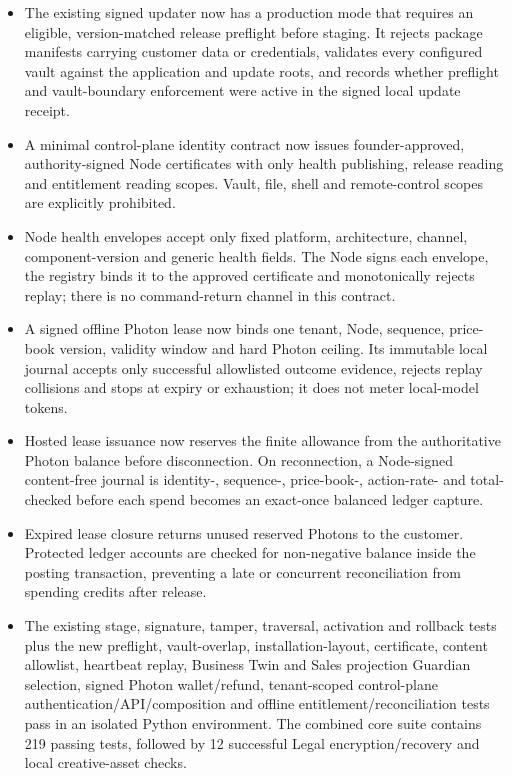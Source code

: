 \documentclass[11pt]{article}
\begin{document}
\begin{itemize}
  \item The existing signed updater now has a production mode that requires an eligible, version-matched release preflight before staging. It rejects package manifests carrying customer data or credentials, validates every configured vault against the application and update roots, and records whether preflight and vault-boundary enforcement were active in the signed local update receipt.
  \item A minimal control-plane identity contract now issues founder-approved, authority-signed Node certificates with only health publishing, release reading and entitlement reading scopes. Vault, file, shell and remote-control scopes are explicitly prohibited.
  \item Node health envelopes accept only fixed platform, architecture, channel, component-version and generic health fields. The Node signs each envelope, the registry binds it to the approved certificate and monotonically rejects replay; there is no command-return channel in this contract.
  \item A signed offline Photon lease now binds one tenant, Node, sequence, price-book version, validity window and hard Photon ceiling. Its immutable local journal accepts only successful allowlisted outcome evidence, rejects replay collisions and stops at expiry or exhaustion; it does not meter local-model tokens.
  \item Hosted lease issuance now reserves the finite allowance from the authoritative Photon balance before disconnection. On reconnection, a Node-signed content-free journal is identity-, sequence-, price-book-, action-rate- and total-checked before each spend becomes an exact-once balanced ledger capture.
  \item Expired lease closure returns unused reserved Photons to the customer. Protected ledger accounts are checked for non-negative balance inside the posting transaction, preventing a late or concurrent reconciliation from spending credits after release.
  \item The existing stage, signature, tamper, traversal, activation and rollback tests plus the new preflight, vault-overlap, installation-layout, certificate, content allowlist, heartbeat replay, Business Twin and Sales projection Guardian selection, signed Photon wallet/refund, tenant-scoped control-plane authentication/API/composition and offline entitlement/reconciliation tests pass in an isolated Python environment. The combined core suite contains 219 passing tests, followed by 12 successful Legal encryption/recovery and local creative-asset checks.

\end{itemize}
\end{document}
